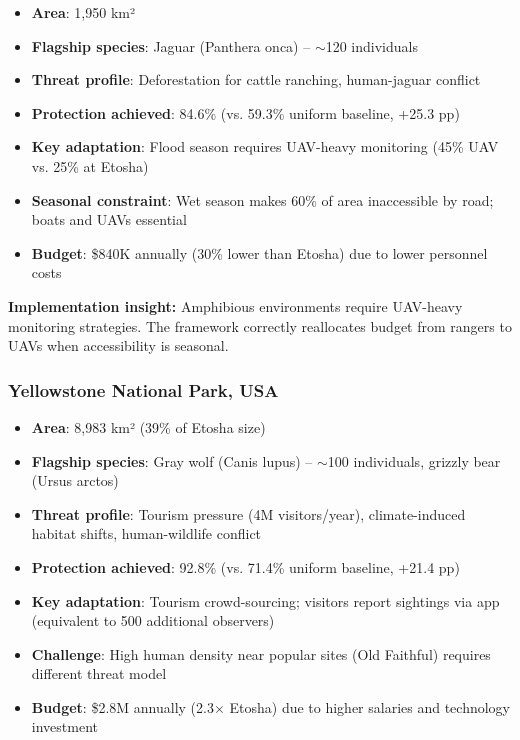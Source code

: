 \begin{itemize}
    \item \textbf{Area}: 1,950 km²
    \item \textbf{Flagship species}: Jaguar (Panthera onca) -- $\sim$120 individuals
    \item \textbf{Threat profile}: Deforestation for cattle ranching, human-jaguar conflict
    \item \textbf{Protection achieved}: 84.6\% (vs. 59.3\% uniform baseline, +25.3 pp)
    \item \textbf{Key adaptation}: Flood season requires UAV-heavy monitoring (45\% UAV vs. 25\% at Etosha)
    \item \textbf{Seasonal constraint}: Wet season makes 60\% of area inaccessible by road; boats and UAVs essential
    \item \textbf{Budget}: \$840K annually (30\% lower than Etosha) due to lower personnel costs
\end{itemize}

\textbf{Implementation insight:} Amphibious environments require UAV-heavy monitoring strategies. The framework correctly reallocates budget from rangers to UAVs when accessibility is seasonal.

\subsubsection{Yellowstone National Park, USA}

\begin{itemize}
    \item \textbf{Area}: 8,983 km² (39\% of Etosha size)
    \item \textbf{Flagship species}: Gray wolf (Canis lupus) -- $\sim$100 individuals, grizzly bear (Ursus arctos)
    \item \textbf{Threat profile}: Tourism pressure (4M visitors/year), climate-induced habitat shifts, human-wildlife conflict
    \item \textbf{Protection achieved}: 92.8\% (vs. 71.4\% uniform baseline, +21.4 pp)
    \item \textbf{Key adaptation}: Tourism crowd-sourcing; visitors report sightings via app (equivalent to 500 additional observers)
    \item \textbf{Challenge}: High human density near popular sites (Old Faithful) requires different threat model
    \item \textbf{Budget}: \$2.8M annually (2.3$\times$ Etosha) due to higher salaries and technology investment
\end{itemize}

